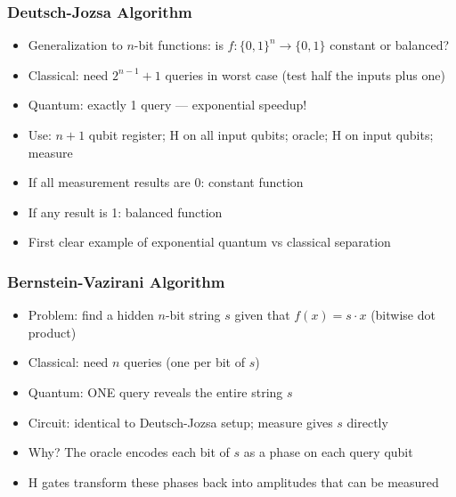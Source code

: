 \begin{frame}[fragile]\frametitle{Deutsch-Jozsa Algorithm}
\begin{itemize}
\item Generalization to $n$-bit functions: is $f: \{0,1\}^n \to \{0,1\}$ constant or balanced?
\item Classical: need $2^{n-1}+1$ queries in worst case (test half the inputs plus one)
\item Quantum: exactly 1 query --- exponential speedup!
\item Use: $n+1$ qubit register; H on all input qubits; oracle; H on input qubits; measure
\item If all measurement results are 0: constant function
\item If any result is 1: balanced function
\item First clear example of exponential quantum vs classical separation
\end{itemize}
\end{frame}

\begin{frame}[fragile]\frametitle{Bernstein-Vazirani Algorithm}
\begin{itemize}
\item Problem: find a hidden $n$-bit string $s$ given that $f(x) = s \cdot x$ (bitwise dot product)
\item Classical: need $n$ queries (one per bit of $s$)
\item Quantum: ONE query reveals the entire string $s$
\item Circuit: identical to Deutsch-Jozsa setup; measure gives $s$ directly
\item Why? The oracle encodes each bit of $s$ as a phase on each query qubit
\item H gates transform these phases back into amplitudes that can be measured
\end{itemize}
\end{frame}

